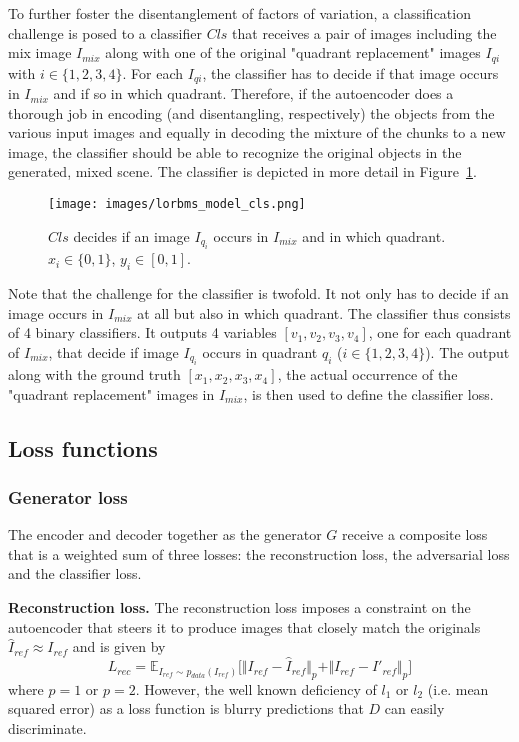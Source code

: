\documentclass[12pt,a4paper]{article}
\begin{document}
To further foster the disentanglement of factors of variation, a classification challenge is posed to a classifier $Cls$ that receives a pair of images including the mix image $I_{mix}$ along with one of the original "quadrant replacement" images $I_{qi}$ with $i \in \{1,2,3,4\}$. For each $I_{qi}$, the classifier has to decide if that image occurs in $I_{mix}$ and if so in which quadrant. Therefore, if the autoencoder does a thorough job in encoding (and disentangling, respectively) the objects from the various input images and equally in decoding the mixture of the chunks to a new image, the classifier should be able to recognize the original objects in the generated, mixed scene. The classifier is depicted in more detail in Figure~\ref{fig:model_cls}.
\begin{figure}[ht]
\centering
\texttt{[image: images/lorbms\_model\_cls.png]}
\caption{$Cls$ decides if an image $I_{q_i}$ occurs in $I_{mix}$ and in which quadrant. $x_i \in \{0,1\}$, $y_i \in [0,1]$.}
\label{fig:model_cls}
\end{figure}
Note that the challenge for the classifier is twofold. It not only has to decide if an image occurs in $I_{mix}$ at all but also in which quadrant. The classifier thus consists of 4 binary classifiers. It outputs 4 variables $[v_1,v_2,v_3,v_4]$, one for each quadrant of $I_{mix}$, that decide if image $I_{q_i}$ occurs in quadrant $q_i$ ($i \in \{1,2,3,4\}$). The output along with the ground truth $[x_1,x_2,x_3,x_4]$, the actual occurrence of the "quadrant replacement" images in $I_{mix}$, is then used to define the classifier loss.


\subsection{Loss functions}
\subsubsection{Generator loss}
The encoder and decoder together as the generator $G$ receive a composite loss that is a weighted sum of three losses: the reconstruction loss, the adversarial loss and the classifier loss. 

\textbf{Reconstruction loss.} The reconstruction loss imposes a constraint on the autoencoder that steers it to produce images that closely match the originals $\hat{I}_{ref} \approx I_{ref}$ and is given by
\begin{equation} \label{eq:4}
    L_{rec} = \mathbb{E}_{I_{ref}\sim p_{data} (I_{ref})}\big[ \Vert I_{ref} - \hat{I}_{ref} \Vert_p + \Vert I_{ref} - I'_{ref} \Vert_p \big]
\end{equation}
where $p = 1$ or $p = 2$. However, the well known deficiency of $l_1$ or $l_2$ (i.e. mean squared error) as a loss function is blurry predictions that $D$ can easily discriminate. 
\end{document}
